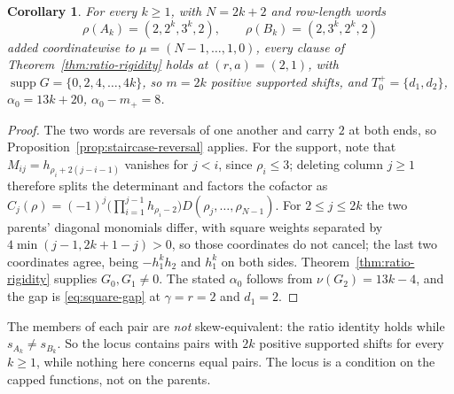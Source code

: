 \documentclass[11pt,a4paper]{amsart}
\numberwithin{equation}{section}
\theoremstyle{plain}
\newtheorem{corollary}[theorem]{Corollary}
\theoremstyle{definition}
\DeclareMathOperator{\supp}{supp}
\newcommand{\wt}{\nu}
\begin{document}
\begin{corollary}\label{cor:locus-family}
For every \(k\ge1\), with \(N=2k+2\) and row-length words
\[
\rho(A_k)=(2,2^k,3^k,2),
\qquad
\rho(B_k)=(2,3^k,2^k,2)
\]
added coordinatewise to \(\mu=(N-1,\ldots,1,0)\), every clause of
Theorem~\ref{thm:ratio-rigidity} holds at \((r,a)=(2,1)\), with
\(\supp G=\{0,2,4,\ldots,4k\}\), so \(m=2k\) positive supported
shifts, and \(T_0^+=\{d_1,d_2\}\), \(\alpha_0=13k+20\), \(\alpha_0-m_+=8\).
\end{corollary}

\begin{proof}
The two words are reversals of one another and carry \(2\) at both ends, so
Proposition~\ref{prop:staircase-reversal} applies.  For the support, note that
\(M_{ij}=h_{\rho_i+2(j-i-1)}\) vanishes for \(j<i\), since \(\rho_i\le3\); deleting
column \(j\ge1\) therefore splits the determinant and factors the cofactor as
\(C_j(\rho)=(-1)^j\bigl(\prod_{i=1}^{j-1}h_{\rho_i-2}\bigr)D(\rho_j,\ldots,\rho_{N-1})\).
For \(2\le j\le2k\) the two parents' diagonal monomials differ, with square
weights separated by \(4\min(j-1,2k+1-j)>0\), so those coordinates do not cancel;
the last two coordinates agree, being \(-h_1^kh_2\) and \(h_1^k\) on both sides.
Theorem~\ref{thm:ratio-rigidity} supplies \(G_0,G_1\ne0\).  The stated
\(\alpha_0\) follows from \(\wt(G_2)=13k-4\), and the gap is
\eqref{eq:square-gap} at \(\gamma=r=2\) and \(d_1=2\).
\end{proof}

The members of each pair are \emph{not} skew-equivalent: the ratio identity holds
while \(s_{A_k}\ne s_{B_k}\).  So the locus contains pairs with \(2k\) positive
supported shifts for every \(k\ge1\), while nothing here concerns equal pairs.  The locus is a
condition on the capped functions, not on the parents.
\end{document}
